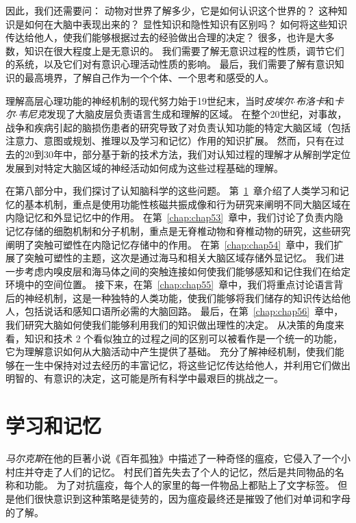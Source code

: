 因此，我们还需要问：
动物对世界了解多少，它是如何认识这个世界的？
这种知识是如何在大脑中表现出来的？
显性知识和隐性知识有区别吗？
如何将这些知识传达给他人，使我们能够根据过去的经验做出合理的决定？
很多，也许是大多数，知识在很大程度上是无意识的。
我们需要了解无意识过程的性质，调节它们的系统，以及它们对有意识心理活动性质的影响。
最后，我们需要了解有意识知识的最高境界，了解自己作为一个个体、一个思考和感受的人。


理解高层心理功能的神经机制的现代努力始于19世纪末，当时\textit{皮埃尔$\cdot$布洛卡}和\textit{卡尔$\cdot$韦尼克}发现了大脑皮层负责语言生成和理解的区域。
在整个20世纪，对事故，战争和疾病引起的脑损伤患者的研究导致了对负责认知功能的特定大脑区域（包括注意力、意图或规划、推理以及学习和记忆）作用的知识扩展。
然而，只有在过去的20到30年中，部分基于新的技术方法，我们对认知过程的理解才从解剖学定位发展到对特定大脑区域的神经活动如何成为这些过程基础的理解。


在第八部分中，我们探讨了认知脑科学的这些问题。
第~\ref{chap:chap52}~章介绍了人类学习和记忆的基本机制，重点是使用功能性核磁共振成像和行为研究来阐明不同大脑区域在内隐记忆和外显记忆中的作用。
在第~\ref{chap:chap53}~章中，我们讨论了负责内隐记忆存储的细胞机制和分子机制，重点是无脊椎动物和脊椎动物的研究，这些研究阐明了突触可塑性在内隐记忆存储中的作用。
在第~\ref{chap:chap54}~章中，我们扩展了突触可塑性的主题，这次是通过海马和相关大脑区域存储外显记忆。
我们进一步考虑内嗅皮层和海马体之间的突触连接如何使我们能够感知和记住我们在给定环境中的空间位置。
接下来，在第~\ref{chap:chap55}~章中，我们将重点讨论语言背后的神经机制，这是一种独特的人类功能，使我们能够将我们储存的知识传达给他人，包括说话和感知口语所必需的大脑回路。
最后，在第~\ref{chap:chap56}~章中，我们研究大脑如何使我们能够利用我们的知识做出理性的决定。
从决策的角度来看，知识和技术 2 个看似独立的过程之间的区别可以被看作是一个统一的功能，它为理解意识如何从大脑活动中产生提供了基础。
充分了解神经机制，使我们能够在一生中保持对过去经历的丰富记忆，将这些记忆传达给他人，并利用它们做出明智的、有意识的决定，这可能是所有科学中最艰巨的挑战之一。



\chapter{学习和记忆} \label{chap:chap52}

\textit{马尔克斯}在他的巨著小说《百年孤独》中描述了一种奇怪的瘟疫，它侵入了一个小村庄并夺走了人们的记忆。
村民们首先失去了个人的记忆，然后是共同物品的名称和功能。
为了对抗瘟疫，每个人的家里的每一件物品上都贴上了文字标签。
但是他们很快意识到这种策略是徒劳的，因为瘟疫最终还是摧毁了他们对单词和字母的了解。


